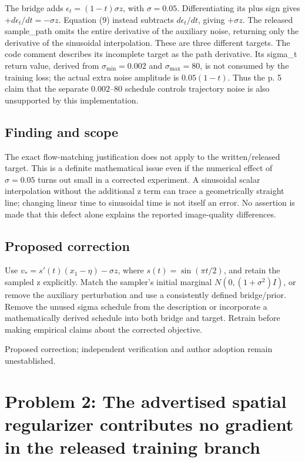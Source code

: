 \documentclass[11pt]{article}
\begin{document}
The bridge adds \(\epsilon_t=(1-t)\sigma z\), with \(\sigma=0.05\). Differentiating its plus sign gives \(+d\epsilon_t/dt=-\sigma z\). Equation (\(9\)) instead subtracts \(d\epsilon_t/dt\), giving \(+\sigma z\). The released sample\_path omits the entire derivative of the auxiliary noise, returning only the derivative of the sinusoidal interpolation. These are three different targets. The code comment describes its incomplete target as the path derivative. Its sigma\_t return value, derived from \(\sigma_{\min}=0.002\) and \(\sigma_{\max}=80\), is not consumed by the training loss; the actual extra noise amplitude is \(0.05(1-t)\). Thus the p. 5 claim that the separate \(0.002\)–\(80\) schedule controls trajectory noise is also unsupported by this implementation.

\subsection*{Finding and scope}

The exact flow-matching justification does not apply to the written/released target. This is a definite mathematical issue even if the numerical effect of \(\sigma=0.05\) turns out small in a corrected experiment. A sinusoidal scalar interpolation without the additional z term can trace a geometrically straight line; changing linear time to sinusoidal time is not itself an error. No assertion is made that this defect alone explains the reported image-quality differences.

\subsection*{Proposed correction}

Use \(v_*=s'(t)(x_1-\eta)-\sigma z\), where \(s(t)=\sin(\pi t/2)\), and retain the sampled z explicitly. Match the sampler's initial marginal \(N(0,(1+\sigma^2)I)\), or remove the auxiliary perturbation and use a consistently defined bridge/prior. Remove the unused sigma schedule from the description or incorporate a mathematically derived schedule into both bridge and target. Retrain before making empirical claims about the corrected objective.

Proposed correction; independent verification and author adoption remain unestablished.

\section*{Problem 2: The advertised spatial regularizer contributes no gradient in the released training branch}
\end{document}
